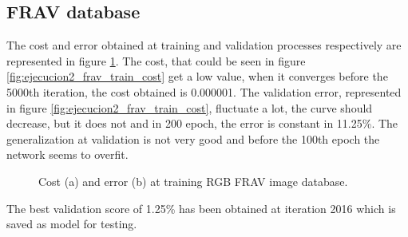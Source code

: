 \subsection{FRAV database}
The cost and error obtained at training and validation processes respectively are represented in figure \ref{fig:ejecucion2_frav_train}. The cost, that could be seen in figure \ref{fig:ejecucion2_frav_train_cost} get a low value, when it converges before the 5000th iteration, the cost obtained is 0.000001. The validation error, represented in figure \ref{fig:ejecucion2_frav_train_cost}, fluctuate a lot, the curve should decrease, but it does not and in 200 epoch, the error is constant in 11.25\%. The generalization at validation is not very good and before the 100th epoch the network seems to overfit.\\
\begin{figure}[htb]
\centering
\caption{Cost (a) and error (b) at training RGB FRAV image database.}
\label{fig:ejecucion2_frav_train}
\end{figure}

The best validation score of 1.25\% has been obtained at iteration 2016 which is saved as model for testing.\\

